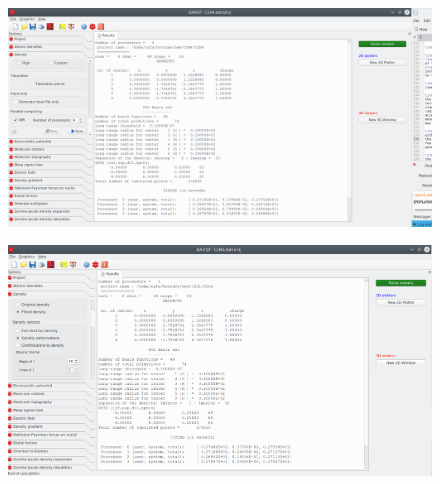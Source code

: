 \documentclass[a4paper,10pt]{article}
\begin{document}
\begin{minipage}{.5\linewidth}
\begin{figure}[H]
\caption{\label{fig:5}}
\begin{center}
\includegraphics[width=0.95\linewidth]{damqt_QS_fig5.png}
\end{center}
\end{figure} 
\end{minipage}
\begin{minipage}{.5\linewidth}
\begin{figure}[H]
\caption{\label{fig:6}}
\begin{center}
\includegraphics[width=0.95\linewidth]{damqt_QS_fig6.png}
\end{center}
\end{figure} 
\end{minipage}
\end{document}
